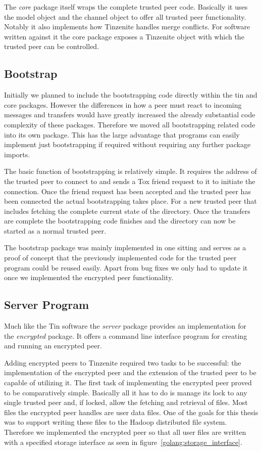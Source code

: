 The \emph{core} package itself wraps the complete trusted peer code.
Basically it uses the model object and the channel object to offer all trusted peer functionality.
Notably it also implements how Tinzenite handles merge conflicts.
For software written against it the core package exposes a Tinzenite object with which the trusted peer can be controlled.

\subsection{Bootstrap}
\label{sub:Bootstrap}

Initially we planned to include the bootstrapping code directly within the tin and core packages.
However the differences in how a peer must react to incoming messages and transfers would have greatly increased the already substantial code complexity of these packages.
Therefore we moved all bootstrapping related code into its own package.
This has the large advantage that programs can easily implement just bootstrapping if required without requiring any further package imports.

The basic function of bootstrapping is relatively simple.
It requires the address of the trusted peer to connect to and sends a Tox friend request to it to initiate the connection.
Once the friend request has been accepted and the trusted peer has been connected the actual bootstrapping takes place.
For a new trusted peer that includes fetching the complete current state of the directory.
Once the transfers are complete the bootstrapping code finishes and the directory can now be started as a normal trusted peer.

The bootstrap package was mainly implemented in one sitting and serves as a proof of concept that the previously implemented code for the trusted peer program could be reused easily.
Apart from bug fixes we only had to update it once we implemented the encrypted peer functionality.

\subsection{Server Program}
\label{sub:Server Program}

Much like the Tin software the \emph{server} package provides an implementation for the \emph{encrypted} package.
It offers a command line interface program for creating and running an encrypted peer.

Adding encrypted peers to Tinzenite required two tasks to be successful: the implementation of the encrypted peer and the extension of the trusted peer to be capable of utilizing it.
The first task of implementing the encrypted peer proved to be comparatively simple.
Basically all it has to do is manage its lock to any single trusted peer and, if locked, allow the fetching and retrieval of files.
Most files the encrypted peer handles are user data files.
One of the goals for this thesis was to support writing these files to the Hadoop distributed file system.
Therefore we implemented the encrypted peer so that all user files are written with a specified storage interface as seen in figure~\ref{golang:storage_interface}.

